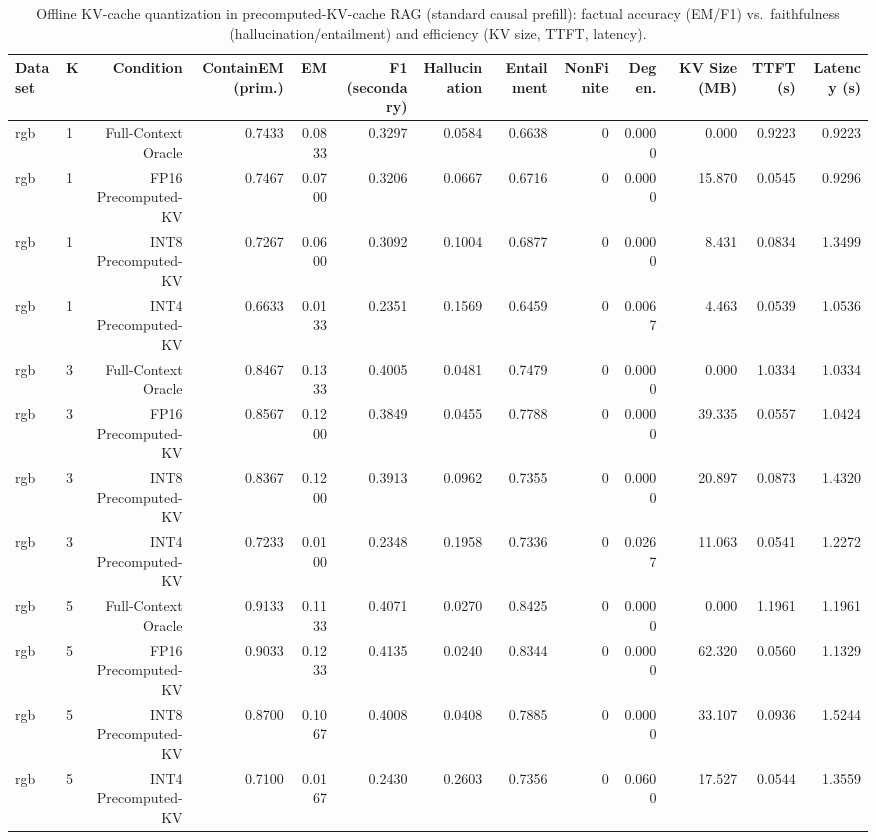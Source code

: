 \begin{table}[t]
\centering
\small
\begin{tabular}{llrrrrrrrrrrr}
\toprule
Dataset & K & Condition & ContainEM (prim.) & EM & F1 (secondary) & Hallucination & Entailment & NonFinite & Degen. & KV Size (MB) & TTFT (s) & Latency (s) \\
\midrule
rgb & 1 & Full-Context Oracle & 0.7433 & 0.0833 & 0.3297 & 0.0584 & 0.6638 & 0 & 0.0000 & 0.000 & 0.9223 & 0.9223 \\
rgb & 1 & FP16 Precomputed-KV & 0.7467 & 0.0700 & 0.3206 & 0.0667 & 0.6716 & 0 & 0.0000 & 15.870 & 0.0545 & 0.9296 \\
rgb & 1 & INT8 Precomputed-KV & 0.7267 & 0.0600 & 0.3092 & 0.1004 & 0.6877 & 0 & 0.0000 & 8.431 & 0.0834 & 1.3499 \\
rgb & 1 & INT4 Precomputed-KV & 0.6633 & 0.0133 & 0.2351 & 0.1569 & 0.6459 & 0 & 0.0067 & 4.463 & 0.0539 & 1.0536 \\
rgb & 3 & Full-Context Oracle & 0.8467 & 0.1333 & 0.4005 & 0.0481 & 0.7479 & 0 & 0.0000 & 0.000 & 1.0334 & 1.0334 \\
rgb & 3 & FP16 Precomputed-KV & 0.8567 & 0.1200 & 0.3849 & 0.0455 & 0.7788 & 0 & 0.0000 & 39.335 & 0.0557 & 1.0424 \\
rgb & 3 & INT8 Precomputed-KV & 0.8367 & 0.1200 & 0.3913 & 0.0962 & 0.7355 & 0 & 0.0000 & 20.897 & 0.0873 & 1.4320 \\
rgb & 3 & INT4 Precomputed-KV & 0.7233 & 0.0100 & 0.2348 & 0.1958 & 0.7336 & 0 & 0.0267 & 11.063 & 0.0541 & 1.2272 \\
rgb & 5 & Full-Context Oracle & 0.9133 & 0.1133 & 0.4071 & 0.0270 & 0.8425 & 0 & 0.0000 & 0.000 & 1.1961 & 1.1961 \\
rgb & 5 & FP16 Precomputed-KV & 0.9033 & 0.1233 & 0.4135 & 0.0240 & 0.8344 & 0 & 0.0000 & 62.320 & 0.0560 & 1.1329 \\
rgb & 5 & INT8 Precomputed-KV & 0.8700 & 0.1067 & 0.4008 & 0.0408 & 0.7885 & 0 & 0.0000 & 33.107 & 0.0936 & 1.5244 \\
rgb & 5 & INT4 Precomputed-KV & 0.7100 & 0.0167 & 0.2430 & 0.2603 & 0.7356 & 0 & 0.0600 & 17.527 & 0.0544 & 1.3559 \\
\bottomrule
\end{tabular}
\caption{Offline KV-cache quantization in precomputed-KV-cache RAG (standard causal prefill): factual accuracy (EM/F1) vs.\ faithfulness (hallucination/entailment) and efficiency (KV size, TTFT, latency).}
\label{tab:main}
\end{table}
